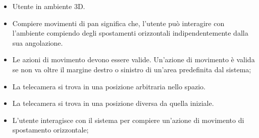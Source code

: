     \UCdsc
        { %
            \begin{itemize}
                \item Utente in ambiente 3D.
            \end{itemize}
        }
        { %
            \begin{itemize}
                \item Compiere movimenti di pan significa che, l'utente può interagire con l'ambiente compiendo degli spostamenti orizzontali indipendentemente dalla sua angolazione.
            \end{itemize}
        }
        { %
            \begin{itemize}
                \item Le azioni di movimento devono essere valide. Un'azione di movimento è valida se non va oltre il margine destro o sinistro di un'area predefinita dal sistema;
                \item La telecamera si trova in una posizione arbitraria nello spazio.
            \end{itemize}
        }
        { %
            \begin{itemize}
                \item La telecamera si trova in una posizione diversa da quella iniziale.
            \end{itemize}
        }
        { %
            \begin{itemize}
                \item L'utente interagisce con il sistema per compiere un'azione di movimento di spostamento orizzontale;
            \end{itemize}
        }


